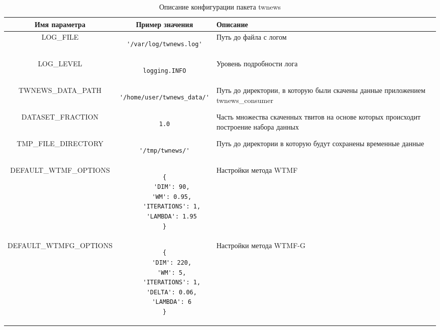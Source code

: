         \begin{table}[h!]
            \small
            \caption{Описание конфигурации пакета twnews \bigskip}
            \center

            \label{tabular:core_config}
            \begin{tabular}{|c|c|m{5cm}|}
                \hline
                \bf{Имя параметра} & \bf{Пример значения} & \bf{Описание} \\ \hline

                LOG\_FILE & \begin{lstlisting}[basicstyle=\small]
'/var/log/twnews.log'
                \end{lstlisting} & Путь до файла с логом \\ \hline

                LOG\_LEVEL & \begin{lstlisting}[basicstyle=\small]
logging.INFO
                \end{lstlisting} & Уровень подробности лога \\ \hline

                TWNEWS\_DATA\_PATH & \begin{lstlisting}[basicstyle=\small]
'/home/user/twnews_data/'
                \end{lstlisting} & Путь до директории, в которую были скачены данные приложением twnews\_consumer \\ \hline

                DATASET\_FRACTION & \begin{lstlisting}[basicstyle=\small]
1.0
\end{lstlisting} & Часть множества скаченных твитов на основе которых происходит построение набора данных \\ \hline

                TMP\_FILE\_DIRECTORY & \begin{lstlisting}[basicstyle=\small]
'/tmp/twnews/'
                \end{lstlisting} & Путь до директории в которую будут сохранены временные данные \\ \hline

                 DEFAULT\_WTMF\_OPTIONS & \begin{lstlisting}[basicstyle=\small]
{
    'DIM': 90,
    'WM': 0.95,
    'ITERATIONS': 1,
    'LAMBDA': 1.95
}
                \end{lstlisting} & Настройки метода WTMF \\ \hline

                 DEFAULT\_WTMFG\_OPTIONS & \begin{lstlisting}[basicstyle=\small]
{
    'DIM': 220,
    'WM': 5,
    'ITERATIONS': 1,
    'DELTA': 0.06,
    'LAMBDA': 6
}
                \end{lstlisting} & Настройки метода WTMF-G \\ \hline

            \end{tabular}
        \end{table}

